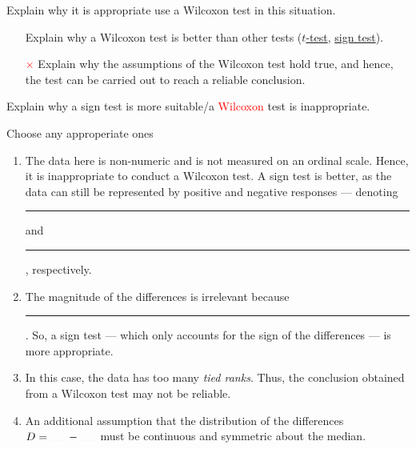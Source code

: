 \documentclass[../Notes.tex]{subfiles}
\begin{document}
\begin{note}
  Explain why it is appropriate use a Wilcoxon test in this situation.
  \begin{enumerate}
    \item[\textcolor{green!70!black}{\checkmark}] Explain why a Wilcoxon test is better than other tests (\hyperlink{wilcoxon>t}{\(t\)-test}, \hyperlink{wilcoxson>sign}{sign test}).
    \item[\textcolor{red}{\(\times\)}] Explain why the assumptions of the Wilcoxon test hold true, and hence, the test can be carried out to reach a reliable conclusion. 
  \end{enumerate}
\end{note}
\begin{note}
  Explain why a sign test is more suitable/a \textcolor{red}{Wilcoxon} test is inappropriate.
  \begin{center}
    \parbox{0.9\textwidth}{
      Choose any approperiate ones
      \begin{enumerate}
        \item The data here is non-numeric and is not measured on an ordinal scale. Hence, it is inappropriate to conduct a Wilcoxon test. A sign test is better, as the data can still be represented by positive and negative responses --- denoting \rule{1cm}{0.01mm} and \rule{1cm}{0.01mm}, respectively.
        \item The magnitude of the differences is irrelevant because \rule{1cm}{0.01mm}. So, a sign test --- which only accounts for the sign of the differences --- is more appropriate.
        \item In this case, the data has too many \emph{tied ranks}. Thus, the conclusion obtained from a Wilcoxon test may not be reliable.
        \item An additional assumption that the distribution of the differences \(D=\rule{0.5cm}{0.01mm}-\rule{0.5cm}{0.01mm}\) must be continuous and symmetric about the median. 
      \end{enumerate}
    }
  \end{center}
\end{note}
\end{document}
